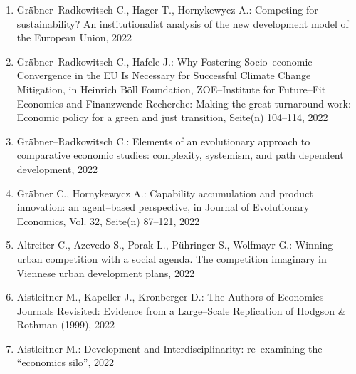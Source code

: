 \begin{enumerate}
	 \item Gräbner--Radkowitsch C., Hager T., Hornykewycz A.: Competing for sustainability? An institutionalist analysis of the new development model of the European Union, 2022
	 \item Gräbner--Radkowitsch C., Hafele J.: Why Fostering Socio--economic Convergence in the EU Is Necessary for Successful Climate Change Mitigation, in Heinrich Böll Foundation, ZOE--Institute for Future--Fit Economies and Finanzwende Recherche: Making the great turnaround work: Economic policy for a green and just transition, Seite(n) 104--114, 2022
	 \item Gräbner--Radkowitsch C.: Elements of an evolutionary approach to comparative economic studies: complexity, systemism, and path dependent development, 2022
	 \item Gräbner C., Hornykewycz A.: Capability accumulation and product innovation: an agent--based perspective, in Journal of Evolutionary Economics, Vol. 32, Seite(n) 87--121, 2022
	 \item Altreiter C., Azevedo S., Porak L., Pühringer S., Wolfmayr G.: Winning urban competition with a social agenda. The competition imaginary in Viennese urban development plans, 2022
	 \item Aistleitner M., Kapeller J., Kronberger D.: The Authors of Economics Journals Revisited: Evidence from a Large--Scale Replication of Hodgson \& Rothman (1999), 2022
	 \item Aistleitner M.: Development and Interdisciplinarity: re--examining the “economics silo”, 2022
\end{enumerate}
